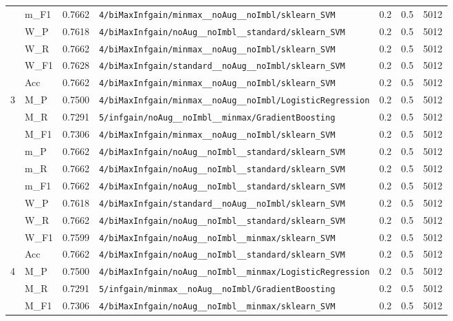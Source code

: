 \begin{table}[htbp]
\begin{tabular}{|c|l|c|>{\ttfamily\footnotesize}p{7.2cm}|c|c|c|}
 & m\_F1 & 0.7662 & \texttt{4/biMaxInfgain/minmax\_\_noAug\_\_noImbl/sklearn\_SVM} & 0.2 & 0.5  & 5012 \\ 
 & W\_P & 0.7618 & \texttt{4/biMaxInfgain/noAug\_\_noImbl\_\_standard/sklearn\_SVM} & 0.2 & 0.5  & 5012 \\ 
 & W\_R & 0.7662 & \texttt{4/biMaxInfgain/minmax\_\_noAug\_\_noImbl/sklearn\_SVM} & 0.2 & 0.5  & 5012 \\ 
 & W\_F1 & 0.7628 & \texttt{4/biMaxInfgain/standard\_\_noAug\_\_noImbl/sklearn\_SVM} & 0.2 & 0.5  & 5012 \\ 
 & Acc & 0.7662 & \texttt{4/biMaxInfgain/minmax\_\_noAug\_\_noImbl/sklearn\_SVM} & 0.2 & 0.5  & 5012 \\ 
\hline
\multirow{10}{*}{3} & M\_P & 0.7500 & \texttt{4/biMaxInfgain/minmax\_\_noAug\_\_noImbl/LogisticRegression} & 0.2 & 0.5  & 5012 \\ 
 & M\_R & 0.7291 & \texttt{5/infgain/noAug\_\_noImbl\_\_minmax/GradientBoosting} & 0.2 & 0.5  & 5012 \\ 
 & M\_F1 & 0.7306 & \texttt{4/biMaxInfgain/minmax\_\_noAug\_\_noImbl/sklearn\_SVM} & 0.2 & 0.5  & 5012 \\ 
 & m\_P & 0.7662 & \texttt{4/biMaxInfgain/noAug\_\_noImbl\_\_standard/sklearn\_SVM} & 0.2 & 0.5  & 5012 \\ 
 & m\_R & 0.7662 & \texttt{4/biMaxInfgain/noAug\_\_noImbl\_\_standard/sklearn\_SVM} & 0.2 & 0.5  & 5012 \\ 
 & m\_F1 & 0.7662 & \texttt{4/biMaxInfgain/noAug\_\_noImbl\_\_standard/sklearn\_SVM} & 0.2 & 0.5  & 5012 \\ 
 & W\_P & 0.7618 & \texttt{4/biMaxInfgain/standard\_\_noAug\_\_noImbl/sklearn\_SVM} & 0.2 & 0.5  & 5012 \\ 
 & W\_R & 0.7662 & \texttt{4/biMaxInfgain/noAug\_\_noImbl\_\_standard/sklearn\_SVM} & 0.2 & 0.5  & 5012 \\ 
 & W\_F1 & 0.7599 & \texttt{4/biMaxInfgain/noAug\_\_noImbl\_\_minmax/sklearn\_SVM} & 0.2 & 0.5  & 5012 \\ 
 & Acc & 0.7662 & \texttt{4/biMaxInfgain/noAug\_\_noImbl\_\_standard/sklearn\_SVM} & 0.2 & 0.5  & 5012 \\ 
\hline
\multirow{10}{*}{4} & M\_P & 0.7500 & \texttt{4/biMaxInfgain/noAug\_\_noImbl\_\_minmax/LogisticRegression} & 0.2 & 0.5  & 5012 \\ 
 & M\_R & 0.7291 & \texttt{5/infgain/minmax\_\_noAug\_\_noImbl/GradientBoosting} & 0.2 & 0.5  & 5012 \\ 
 & M\_F1 & 0.7306 & \texttt{4/biMaxInfgain/noAug\_\_noImbl\_\_minmax/sklearn\_SVM} & 0.2 & 0.5  & 5012 \\ 

\end{tabular}
\end{table}
